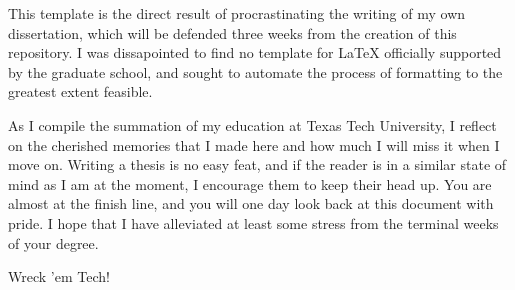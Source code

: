\ThesisAcknowledgments

This template is the direct result of procrastinating the writing of my own
dissertation, which will be defended three weeks from the creation of this repository.
I was dissapointed to find no template for LaTeX officially supported by the 
graduate school, and sought to automate the process of formatting to the greatest
extent feasible. 

As I compile the summation of my education at Texas Tech University, I reflect
on the cherished memories that I made here and how much I will miss it when I 
move on. Writing a thesis is no easy feat, and if the reader is in a similar state of mind 
as I am at the moment, I encourage them to keep their head up. You are almost at the finish line, 
and you will one day look back at this document with pride. I hope that I have alleviated
at least some stress from the terminal weeks of your degree. 

Wreck 'em Tech!
